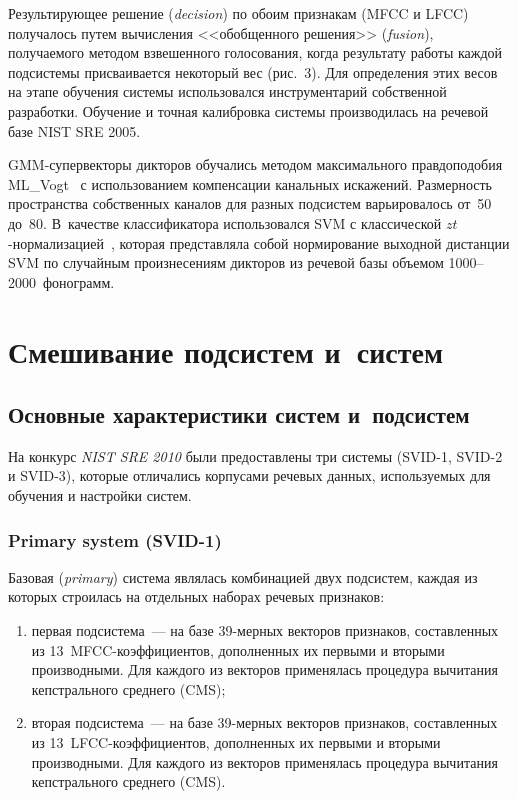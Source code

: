 \begin{multicols}{2}
  
  Результирующее решение (\textit{decision}) по обоим признакам (MFCC и LFCC) 
получалось путем вычисления <<обобщенного решения>> (\textit{fusion}), получаемого 
методом взвешенного голосования, когда результату работы каждой подсистемы 
присваивается некоторый вес (рис.~3). Для определения этих весов на этапе 
обучения системы использовался инструментарий собственной разработки. 
Обучение и точная калибровка системы производилась на речевой базе 
{NIST SRE 2005}.
  

GMM-супервекторы дикторов обучались методом максимального 
правдоподобия ML\_Vogt~\cite{9b} с использованием компенсации канальных 
искажений. Размерность пространства собственных каналов для разных 
подсистем варьировалось от~50 до~80. В~качестве классификатора использовался 
SVM с классической $zt$-нор\-ма\-ли\-за\-ци\-ей~\cite{4b}, которая 
представляла собой нормирование выходной дистанции SVM по случайным 
произнесениям дикторов из речевой базы объемом 1000--2000~фонограмм.

\vspace*{-6pt}
  
\section{Смешивание подсистем и~систем}

\subsection{Основные характеристики систем и~подсистем} %

  На конкурс \textit{NIST SRE 2010} были предоставлены три системы 
(SVID-1, SVID-2 и SVID-3), которые отличались корпусами 
речевых данных, ис\-поль\-зу\-емых для обучения и настройки систем.
  
  \subsubsection{Primary system (SVID-1)}
  
  Базовая (\textit{primary}) система являлась комбинацией двух подсистем, каждая из 
которых строилась на отдельных наборах речевых признаков:
  \begin{enumerate}[(1)]
  \item
  первая подсистема~--- на базе 39-мер\-ных векторов признаков, составленных из 
13~MFCC-ко\-эф\-фи\-ци\-ен\-тов, дополненных их первыми и вторыми 
производными. Для каждого из векторов применялась процедура вычитания 
кепстрального среднего (CMS);
  \item
  вторая подсистема~--- на базе 39-мер\-ных векторов признаков, составленных 
из 13~LFCC-ко\-эф\-фи\-ци\-ен\-тов, дополненных их первыми и вторыми 
производными. Для каждого из векторов применялась процедура вычитания 
кепстрального среднего (CMS).
\end{enumerate}


\end{multicols}
